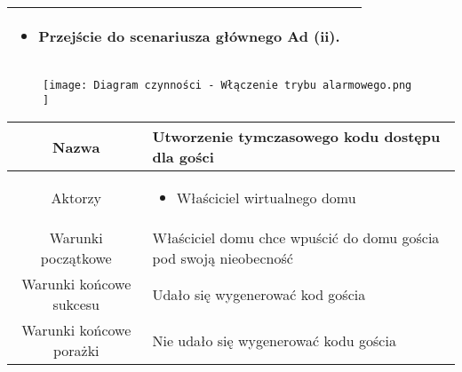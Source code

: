 \documentclass{article}
\begin{document}
\begin{enumerate}
\begin{enumerate}
\begin{table}[H]
\begin{tabular}{|c|p{7cm}|}
\begin{itemize}
\item Przejście do scenariusza głównego Ad (ii).\end{itemize}                                                                         \\
						\hline
					\end{tabular}
				\end{table}

				\begin{figure}[H]
					\centering
					\texttt{[image: 
						Diagram czynności - Włączenie trybu alarmowego.png
					]}
				\end{figure}

				\begin{table}[H]
					\centering
					\begin{tabular}{|c|p{7cm}|}
						\hline
						Nazwa                   & Utworzenie tymczasowego kodu dostępu dla gości                                                                                                                                                                                                                                      \\
						\hline
						Aktorzy                 & \begin{itemize}\item Właściciel wirtualnego domu\end{itemize}                                                                                                                                                                                                                       \\
						\hline
						Warunki początkowe      & Właściciel domu chce wpuścić do domu gościa pod swoją nieobecność                                                                                                                                                                                                                   \\
						\hline
						Warunki końcowe sukcesu & Udało się wygenerować kod gościa                                                                                                                                                                                                                                                    \\
						\hline
						Warunki końcowe porażki & Nie udało się wygenerować kodu gościa                                                                                                                                                                                                                                               \\

\end{tabular}
\end{table}
\end{enumerate}
\end{enumerate}
\end{document}
